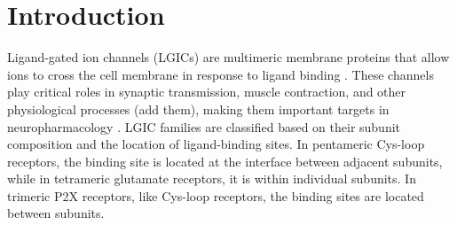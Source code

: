 \documentclass[pdflatex,sn-mathphys-num]{sn-jnl}%
\theoremstyle{thmstyleone}%
\theoremstyle{thmstyletwo}%
\theoremstyle{thmstylethree}%
\begin{document}
% 
% 
% 


\maketitle

\section{Introduction}
\label{sec1}


Ligand-gated ion channels (LGICs) are multimeric membrane proteins that allow ions to cross the cell membrane in response to ligand binding \cite{p2x_cuerpo_humano}. These channels play critical roles in synaptic transmission, muscle contraction, and other physiological processes (add them), making them important targets in neuropharmacology \cite{p2x_drugs,therapeutic,p2x7_pharmacology}. LGIC families are classified based on their subunit composition and the location of ligand-binding sites. In pentameric Cys-loop receptors, the binding site is located at the interface between adjacent subunits, while in tetrameric glutamate receptors, it is within individual subunits. In trimeric P2X receptors, like Cys-loop receptors, the binding sites are located between subunits.
\end{document}
